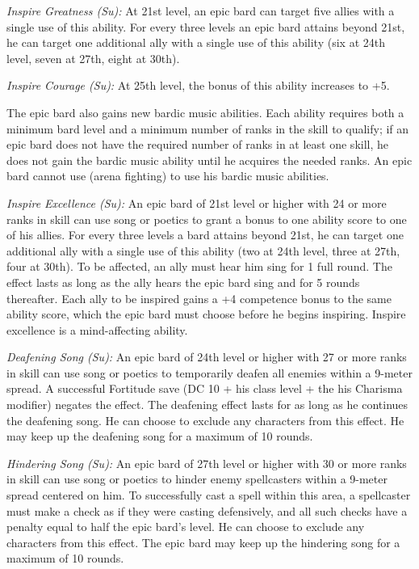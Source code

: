 \textit{Inspire Greatness (Su):} At 21st level, an epic bard can target five allies with a single use of this ability. For every three levels an epic bard attains beyond 21st, he can target one additional ally with a single use of this ability (six at 24th level, seven at 27th, eight at 30th).

\textit{Inspire Courage (Su):} At 25th level, the bonus of this ability increases to +5.

The epic bard also gains new bardic music abilities. Each ability requires both a minimum bard level and a minimum number of ranks in the  skill to qualify; if an epic bard does not have the required number of ranks in at least one  skill, he does not gain the bardic music ability until he acquires the needed ranks. An epic bard cannot use  (arena fighting) to use his bardic music abilities.

\textit{Inspire Excellence (Su):} An epic bard of 21st level or higher with 24 or more ranks in  skill can use song or poetics to grant a bonus to one ability score to one of his allies. For every three levels a bard attains beyond 21st, he can target one additional ally with a single use of this ability (two at 24th level, three at 27th, four at 30th). To be affected, an ally must hear him sing for 1 full round. The effect lasts as long as the ally hears the epic bard sing and for 5 rounds thereafter. Each ally to be inspired gains a +4 competence bonus to the same ability score, which the epic bard must choose before he begins inspiring. Inspire excellence is a mind-affecting ability.

\textit{Deafening Song (Su):} An epic bard of 24th level or higher with 27 or more ranks in  skill can use song or poetics to temporarily deafen all enemies within a 9-meter spread. A successful Fortitude save (DC 10 + \onehalf his class level + the his Charisma modifier) negates the effect. The deafening effect lasts for as long as he continues the deafening song. He can choose to exclude any characters from this effect. He may keep up the deafening song for a maximum of 10 rounds.

\textit{Hindering Song (Su):} An epic bard of 27th level or higher with 30 or more ranks in  skill can use song or poetics to hinder enemy spellcasters within a 9-meter spread centered on him. To successfully cast a spell within this area, a spellcaster must make a  check as if they were casting defensively, and all such checks have a penalty equal to half the epic bard's level. He can choose to exclude any characters from this effect. The epic bard may keep up the hindering song for a maximum of 10 rounds.


